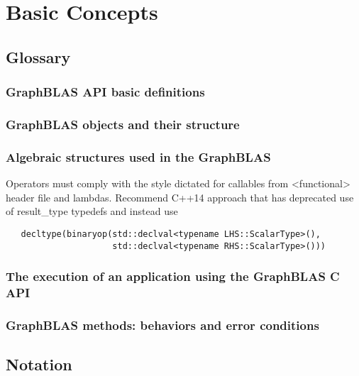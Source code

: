 \chapter{Basic Concepts}
\label{Chp:Concepts}

\section{Glossary}

\subsection{GraphBLAS API basic definitions}

\subsection{GraphBLAS objects and their structure}

\subsection{Algebraic structures used in the GraphBLAS}

Operators must comply with the style dictated for callables from {\sf <functional>} 
header file and lambdas.  Recommend C++14 approach that has deprecated use of {\sf result\_type}
typedefs and instead use
\begin{verbatim}
   decltype(binaryop(std::declval<typename LHS::ScalarType>(),
                     std::declval<typename RHS::ScalarType>()))
\end{verbatim}

\subsection{The execution of an application using the GraphBLAS C API}

\subsection{GraphBLAS methods: behaviors and error conditions}


\section{Notation}


